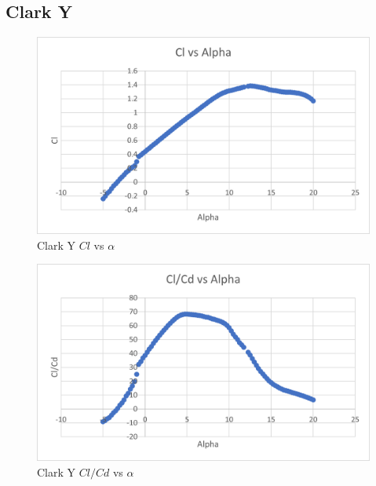 \documentclass{article}
\begin{document}
\subsection{Clark Y}
\begin{figure}[!h]
\begin{center}
	\includegraphics[scale=0.7]{ClarkY Clalpha.png}
	\caption{Clark Y $Cl$ vs $\alpha$}
	\label{Figure10:}
\end{center}
\end{figure}

\begin{figure}[!h]
\begin{center}
	\includegraphics[scale=0.7]{ClarkY Efficiencyalpha.png}
	\caption{Clark Y $Cl/Cd$ vs $\alpha$}
	\label{Figure11:}
\end{center}
\end{figure}
\end{document}
